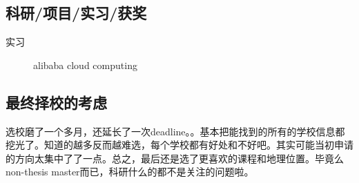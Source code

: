 \documentclass[11pt,fleqn,openany]{book} %
\begin{document}
\subsection*{科研/项目/实习/获奖}
\begin{description}
\item[实习] alibaba cloud computing
\end{description}
\subsection*{最终择校的考虑}
选校磨了一个多月，还延长了一次deadline。。基本把能找到的所有的学校信息都挖光了。知道的越多反而越难选，每个学校都有好处和不好吧。其实可能当初申请的方向太集中了了一点。总之，最后还是选了更喜欢的课程和地理位置。毕竟么non-thesis master而已，科研什么的都不是关注的问题啦。
\clearpage
\end{document}
